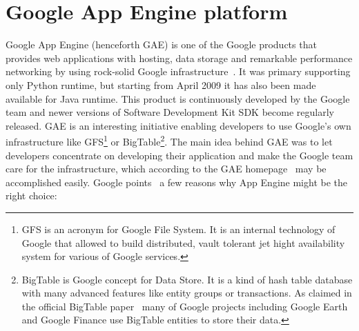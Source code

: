 \section{Google App Engine platform}\label{sec:gae_general}
Google App Engine (henceforth GAE) is one of the Google products that provides web applications with hosting, data storage and remarkable performance networking by using rock-solid Google infrastructure~\cite[page 1]{gae_develop}. It was primary supporting only Python runtime, but starting from April 2009 it has also been made available for Java runtime. This product is continuously developed by the Google team and newer versions of Software Development Kit SDK become regularly released. GAE is an interesting initiative enabling developers to use Google's own infrastructure like GFS\footnote{GFS is an acronym for Google File System. It is an internal technology of Google that allowed to build distributed, vault tolerant jet hight availability system for various of Google services.} or BigTable\footnote{BigTable is Google concept for Data Store. It is a kind of hash table database with many advanced features like entity groups or transactions. As claimed in the official BigTable paper~\cite{bigtable_about} many of Google projects including Google Earth and Google Finance use BigTable entities to store their data.}. The main idea behind GAE was to let developers concentrate on developing their application and make the Google team care for the infrastructure, which according to the GAE homepage~\cite{gae_homepage} may be accomplished easily. Google points~\cite{gae_why} a few reasons why App Engine might be the right choice: 
